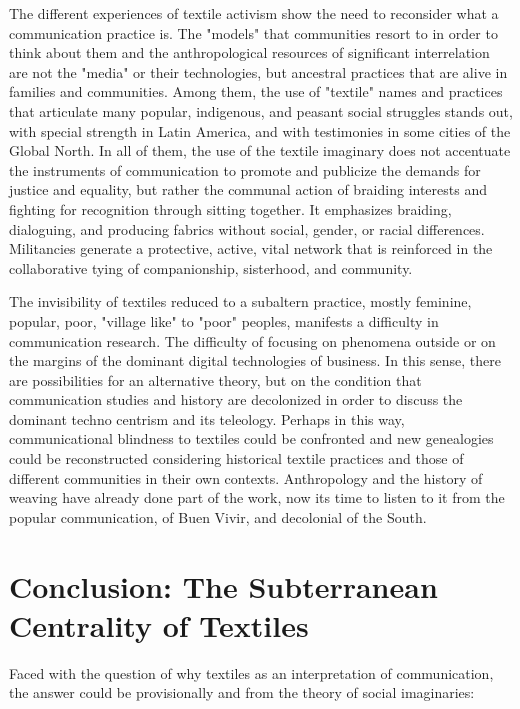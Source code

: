 \documentclass{tufte-handout}
\begin{document}
The different experiences of textile activism show the need to
reconsider what a communication practice is. The "models" that
communities resort to in order to think about them and the
anthropological resources of significant interrelation are not the
"media" or their technologies, but ancestral practices that are alive in
families and communities. Among them, the use of "textile" names and
practices that articulate many popular, indigenous, and peasant social
struggles stands out, with special strength in Latin America, and with
testimonies in some cities of the Global North. In all of them, the use
of the textile imaginary does not accentuate the instruments of
communication to promote and publicize the demands for justice and
equality, but rather the communal action of braiding interests and
fighting for recognition through sitting together. It emphasizes
braiding, dialoguing, and producing fabrics without social, gender, or
racial differences. Militancies generate a protective, active, vital
network that is reinforced in the collaborative tying of companionship,
sisterhood, and community.

The invisibility of textiles reduced to a subaltern practice, mostly
feminine, popular, poor, "village like" to "poor" peoples, manifests a
difficulty in communication research. The difficulty of focusing on
phenomena outside or on the margins of the dominant digital technologies
of business. In this sense, there are possibilities for an alternative
theory, but on the condition that communication studies and history are
decolonized in order to discuss the dominant techno centrism and its
teleology. Perhaps in this way, communicational blindness to textiles
could be confronted and new genealogies could be reconstructed
considering historical textile practices and those of different
communities in their own contexts. Anthropology and the history of
weaving have already done part of the work, now it\textquotesingle s
time to listen to it from the popular communication, of Buen Vivir, and
decolonial of the South.

\hypertarget{conclusion-the-subterranean-centrality-of-textiles}{%
\section{Conclusion: The Subterranean Centrality of
Textiles}\label{conclusion-the-subterranean-centrality-of-textiles}}

Faced with the question of why textiles as an interpretation of
communication, the answer could be provisionally and from the theory of
social imaginaries:
\end{document}
